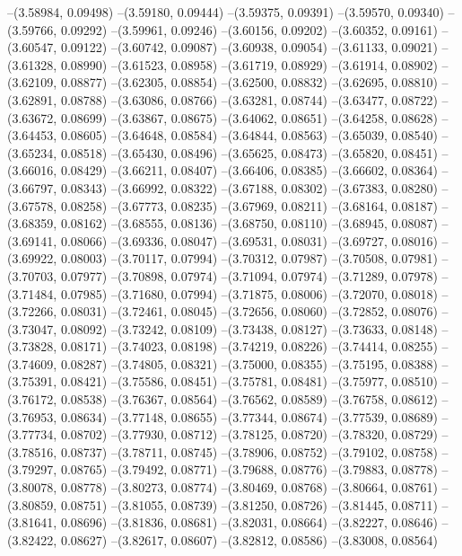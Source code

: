 --(3.58984, 0.09498)
--(3.59180, 0.09444)
--(3.59375, 0.09391)
--(3.59570, 0.09340)
--(3.59766, 0.09292)
--(3.59961, 0.09246)
--(3.60156, 0.09202)
--(3.60352, 0.09161)
--(3.60547, 0.09122)
--(3.60742, 0.09087)
--(3.60938, 0.09054)
--(3.61133, 0.09021)
--(3.61328, 0.08990)
--(3.61523, 0.08958)
--(3.61719, 0.08929)
--(3.61914, 0.08902)
--(3.62109, 0.08877)
--(3.62305, 0.08854)
--(3.62500, 0.08832)
--(3.62695, 0.08810)
--(3.62891, 0.08788)
--(3.63086, 0.08766)
--(3.63281, 0.08744)
--(3.63477, 0.08722)
--(3.63672, 0.08699)
--(3.63867, 0.08675)
--(3.64062, 0.08651)
--(3.64258, 0.08628)
--(3.64453, 0.08605)
--(3.64648, 0.08584)
--(3.64844, 0.08563)
--(3.65039, 0.08540)
--(3.65234, 0.08518)
--(3.65430, 0.08496)
--(3.65625, 0.08473)
--(3.65820, 0.08451)
--(3.66016, 0.08429)
--(3.66211, 0.08407)
--(3.66406, 0.08385)
--(3.66602, 0.08364)
--(3.66797, 0.08343)
--(3.66992, 0.08322)
--(3.67188, 0.08302)
--(3.67383, 0.08280)
--(3.67578, 0.08258)
--(3.67773, 0.08235)
--(3.67969, 0.08211)
--(3.68164, 0.08187)
--(3.68359, 0.08162)
--(3.68555, 0.08136)
--(3.68750, 0.08110)
--(3.68945, 0.08087)
--(3.69141, 0.08066)
--(3.69336, 0.08047)
--(3.69531, 0.08031)
--(3.69727, 0.08016)
--(3.69922, 0.08003)
--(3.70117, 0.07994)
--(3.70312, 0.07987)
--(3.70508, 0.07981)
--(3.70703, 0.07977)
--(3.70898, 0.07974)
--(3.71094, 0.07974)
--(3.71289, 0.07978)
--(3.71484, 0.07985)
--(3.71680, 0.07994)
--(3.71875, 0.08006)
--(3.72070, 0.08018)
--(3.72266, 0.08031)
--(3.72461, 0.08045)
--(3.72656, 0.08060)
--(3.72852, 0.08076)
--(3.73047, 0.08092)
--(3.73242, 0.08109)
--(3.73438, 0.08127)
--(3.73633, 0.08148)
--(3.73828, 0.08171)
--(3.74023, 0.08198)
--(3.74219, 0.08226)
--(3.74414, 0.08255)
--(3.74609, 0.08287)
--(3.74805, 0.08321)
--(3.75000, 0.08355)
--(3.75195, 0.08388)
--(3.75391, 0.08421)
--(3.75586, 0.08451)
--(3.75781, 0.08481)
--(3.75977, 0.08510)
--(3.76172, 0.08538)
--(3.76367, 0.08564)
--(3.76562, 0.08589)
--(3.76758, 0.08612)
--(3.76953, 0.08634)
--(3.77148, 0.08655)
--(3.77344, 0.08674)
--(3.77539, 0.08689)
--(3.77734, 0.08702)
--(3.77930, 0.08712)
--(3.78125, 0.08720)
--(3.78320, 0.08729)
--(3.78516, 0.08737)
--(3.78711, 0.08745)
--(3.78906, 0.08752)
--(3.79102, 0.08758)
--(3.79297, 0.08765)
--(3.79492, 0.08771)
--(3.79688, 0.08776)
--(3.79883, 0.08778)
--(3.80078, 0.08778)
--(3.80273, 0.08774)
--(3.80469, 0.08768)
--(3.80664, 0.08761)
--(3.80859, 0.08751)
--(3.81055, 0.08739)
--(3.81250, 0.08726)
--(3.81445, 0.08711)
--(3.81641, 0.08696)
--(3.81836, 0.08681)
--(3.82031, 0.08664)
--(3.82227, 0.08646)
--(3.82422, 0.08627)
--(3.82617, 0.08607)
--(3.82812, 0.08586)
--(3.83008, 0.08564)
